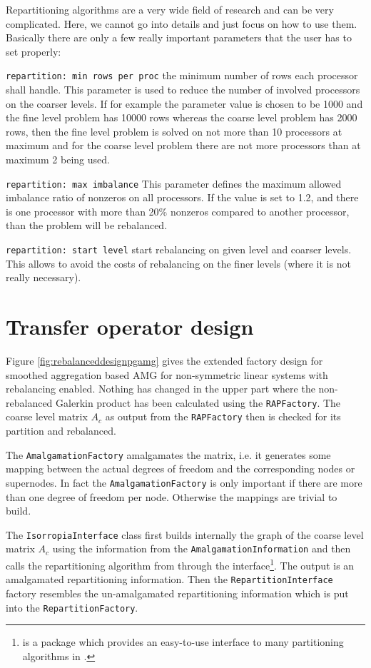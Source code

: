 \documentclass[10pt,fleqn]{book}
\begin{document}
Repartitioning algorithms are a very wide field of research and can be very complicated. Here, we cannot go into details and just focus on how to use them. Basically there are only a few really important parameters that the user has to set properly:
\begin{description}
\item \texttt{repartition: min rows per proc} the minimum number of rows each processor shall handle. This parameter is used to reduce the number of involved processors on the coarser levels. If for example the parameter value is chosen to be 1000 and the fine level problem has 10000 rows whereas the coarse level problem has 2000 rows, then the fine level problem is solved on not more than 10 processors at maximum and for the coarse level problem there are not more processors than at maximum 2 being used.
\item \texttt{repartition: max imbalance} This parameter defines the maximum allowed imbalance ratio of nonzeros on all processors. If the value is set to 1.2, and there is one processor with more than 20\% nonzeros compared to another processor, than the problem will be rebalanced.
\item \texttt{repartition: start level} start rebalancing on given level and coarser levels. This allows to avoid the costs of rebalancing on the finer levels (where it is not really necessary).
\end{description}

\section{Transfer operator design}

Figure \ref{fig:rebalanceddesignpgamg} gives the extended factory design for smoothed aggregation based AMG for non-symmetric linear systems with rebalancing enabled. Nothing has changed in the upper part where the non-rebalanced Galerkin product has been calculated using the \verb|RAPFactory|. The coarse level matrix $A_c$ as output from the \verb|RAPFactory| then is checked for its partition and rebalanced.

The \verb|AmalgamationFactory| amalgamates the matrix, i.e. it generates some mapping between the actual degrees of freedom and the corresponding nodes or supernodes. In fact the \verb|AmalgamationFactory| is only important if there are more than one degree of freedom per node. Otherwise the mappings are trivial to build.

The \verb|IsorropiaInterface| class first builds internally the graph of the coarse level matrix $A_c$ using the information from the \verb|AmalgamationInformation| and then calls the repartitioning algorithm from \zoltan through the \isorropia interface\footnote{\isorropia is a \trilinos package which provides an easy-to-use interface to many partitioning algorithms in \zoltan.}. The output is an amalgamated repartitioning information. Then the \verb|RepartitionInterface| factory resembles the un-amalgamated repartitioning information which is put into the \verb|RepartitionFactory|.
\end{document}

